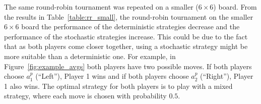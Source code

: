 \documentclass{article}
\begin{document}
%
The same round-robin tournament was repeated on a smaller ($6 \times 6$) board. 
From the results in Table~\ref{table:rr_small}, 
the round-robin tournament on the smaller $6 \times 6$ board the performance of the 
deterministic strategies decrease and the performance of the stochastic strategies increase. 
This could be due to the fact that as both players come closer together, using a stochastic strategy might be more suitable than a deterministic one.
For example, in Figure~\ref{fig:example_avgs} both players have two possible moves. If both players choose $a^{p}_{1}$ (``Left''), Player 1 wins and if both players choose $a^{p}_{2}$ (``Right''), Player 1 also wins. The optimal strategy for both players is to play with a mixed strategy, where each move is chosen with probability $0.5$. 


\end{document}
